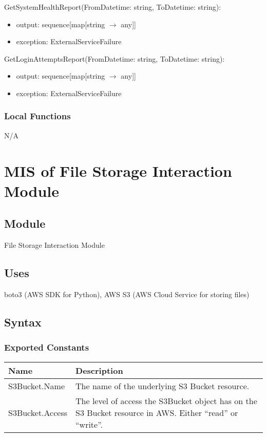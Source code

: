 \documentclass[12pt, titlepage]{article}
\begin{document}
\noindent GetSystemHealthReport(FromDatetime: string, ToDatetime: string):
\begin{itemize}
  \item output: sequence[map[string $\rightarrow$ any]]
  \item exception: ExternalServiceFailure
\end{itemize}

\noindent GetLoginAttemptsReport(FromDatetime: string, ToDatetime: string):
\begin{itemize}
  \item output: sequence[map[string $\rightarrow$ any]]
  \item exception: ExternalServiceFailure
\end{itemize}

\subsubsection{Local Functions}

N/A

\section{MIS of File Storage Interaction Module} \label{Module}

\subsection{Module}

File Storage Interaction Module

\subsection{Uses}

boto3 (AWS SDK for Python), AWS S3 (AWS Cloud Service for storing files)

\subsection{Syntax}

\subsubsection{Exported Constants}

\begin{center}
  \begin{tabular}{p{4cm} p{12cm}}
    \hline
    \textbf{Name} & \textbf{Description} \\
    \hline
    S3Bucket.Name & The name of the underlying S3 Bucket resource. \\
    \hline
    S3Bucket.Access & The level of access the S3Bucket object has on
    the S3 Bucket resource in AWS. Either ``read'' or ``write''. \\
    \hline
  \end{tabular}
\end{center}
\end{document}
